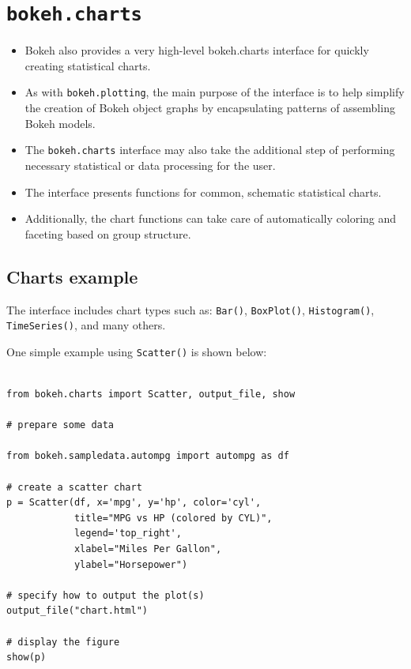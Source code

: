 \documentclass[a4paper,12pt]{article}
\begin{document}
\section*{\texttt{bokeh.charts}}
\begin{itemize}
\item Bokeh also provides a very high-level bokeh.charts interface for quickly creating statistical charts. 
\item As with \texttt{bokeh.plotting}, the main purpose of the interface is to help simplify the creation of Bokeh object graphs by encapsulating patterns of assembling Bokeh models. 
\item The \texttt{bokeh.charts} interface may also take the additional step of performing necessary statistical or data processing for the user. 

\item The interface presents functions for common, schematic statistical charts. \item Additionally, the chart functions can take care of automatically coloring and faceting based on group structure.
\end{itemize}

\newpage

\subsection*{Charts example}
The interface includes chart types such as: \texttt{Bar()}, \texttt{BoxPlot()}, \texttt{Histogram()}, \texttt{TimeSeries()}, and many others. 

One simple example using \texttt{Scatter()} is shown below:
{
	\begin{verbatim}
	
from bokeh.charts import Scatter, output_file, show

# prepare some data

from bokeh.sampledata.autompg import autompg as df

# create a scatter chart
p = Scatter(df, x='mpg', y='hp', color='cyl',
            title="MPG vs HP (colored by CYL)",
            legend='top_right',
            xlabel="Miles Per Gallon",
            ylabel="Horsepower")

# specify how to output the plot(s)
output_file("chart.html")

# display the figure
show(p)
\end{verbatim}

}
\end{document}
